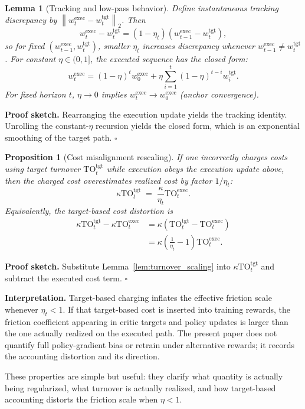 \documentclass[10pt,twocolumn]{article}
\newtheorem{proposition}{Proposition}
\newtheorem{lemma}{Lemma}
\newcommand{\wexec}{w^{\mathrm{exec}}}
\newcommand{\wtgt}{w^{\mathrm{tgt}}}
\newcommand{\TOexec}{\mathrm{TO}^{\mathrm{exec}}}
\newcommand{\TOtgt}{\mathrm{TO}^{\mathrm{tgt}}}
\newcommand{\kappaTC}{\kappa}
\newcommand{\normtwo}[1]{\left\lVert #1 \right\rVert_2}
\begin{document}
\begin{lemma}[Tracking and low-pass behavior]\label{lem:tracking_lowpass}
Define instantaneous tracking discrepancy by $\normtwo{\wexec_t-\wtgt_t}$. Then
\[
\wexec_t-\wtgt_t = (1-\eta_t)(\wexec_{t-1}-\wtgt_t),
\]
so for fixed $(\wexec_{t-1},\wtgt_t)$, smaller $\eta_t$ increases discrepancy whenever $\wexec_{t-1}\neq \wtgt_t$.
For constant $\eta\in(0,1]$, the executed sequence has the closed form:
\[
\wexec_t = (1-\eta)^t \wexec_0 + \eta\sum_{i=1}^{t} (1-\eta)^{t-i}\wtgt_i.
\]
For fixed horizon $t$, $\eta\to0$ implies $\wexec_t\to \wexec_0$ (anchor convergence).
\end{lemma}
\noindent\textbf{Proof sketch.} Rearranging the execution update yields the tracking identity. Unrolling the constant-$\eta$ recursion yields the closed form, which is an exponential smoothing of the target path. \hfill$\square$

\begin{proposition}[Cost misalignment rescaling]\label{prop:cost_misalignment}
If one incorrectly charges costs using target turnover $\TOtgt_t$ while execution obeys the execution update above, then the charged cost overestimates realized cost by factor $1/\eta_t$:
\[
\kappaTC \TOtgt_t \;=\; \frac{\kappaTC}{\eta_t}\TOexec_t.
\]
Equivalently, the target-based cost distortion is
\[
\begin{aligned}
\kappaTC \TOtgt_t - \kappaTC \TOexec_t
&= \kappaTC(\TOtgt_t-\TOexec_t) \\
&= \kappaTC\left(\frac{1}{\eta_t}-1\right)\TOexec_t.
\end{aligned}
\]
\end{proposition}
\noindent\textbf{Proof sketch.} Substitute Lemma~\ref{lem:turnover_scaling} into $\kappaTC\TOtgt_t$ and subtract the executed cost term. \hfill$\square$

\noindent\textbf{Interpretation.} Target-based charging inflates the effective friction scale whenever $\eta_t<1$. If that target-based cost is inserted into training rewards, the friction coefficient appearing in critic targets and policy updates is larger than the one actually realized on the executed path. The present paper does not quantify full policy-gradient bias or retrain under alternative rewards; it records the accounting distortion and its direction.

These properties are simple but useful: they clarify what quantity is actually being regularized, what turnover is actually realized, and how target-based accounting distorts the friction scale when $\eta<1$.
\end{document}
